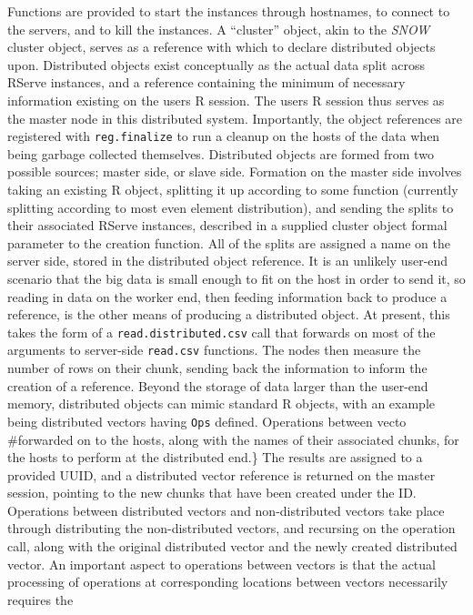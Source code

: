 Functions are provided to start the instances through hostnames, to
connect to the servers, and to kill the instances. A ``cluster'' object,
akin to the \emph{SNOW} cluster object, serves as a reference with which
to declare distributed objects upon. Distributed objects exist
conceptually as the actual data split across RServe instances, and a
reference containing the minimum of necessary information existing on
the users R session. The users R session thus serves as the master node
in this distributed system. Importantly, the object references are
registered with \texttt{reg.finalize} to run a cleanup on the hosts of
the data when being garbage collected themselves. Distributed objects
are formed from two possible sources; master side, or slave side.
Formation on the master side involves taking an existing R object,
splitting it up according to some function (currently splitting
according to most even element distribution), and sending the splits to
their associated RServe instances, described in a supplied cluster
object formal parameter to the creation function. All of the splits are
assigned a name on the server side, stored in the distributed object
reference. It is an unlikely user-end scenario that the big data is
small enough to fit on the host in order to send it, so reading in data
on the worker end, then feeding information back to produce a reference,
is the other means of producing a distributed object. At present, this
takes the form of a \texttt{read.distributed.csv} call that forwards on
most of the arguments to server-side \texttt{read.csv} functions. The
nodes then measure the number of rows on their chunk, sending back the
information to inform the creation of a reference. Beyond the storage of
data larger than the user-end memory, distributed objects can mimic
standard R objects, with an example being distributed vectors having
\texttt{Ops} defined. Operations between vecto \#forwarded on to the
hosts, along with the names of their associated chunks, for the hosts to
perform at the distributed end.\} The results are assigned to a provided
UUID, and a distributed vector reference is returned on the master
session, pointing to the new chunks that have been created under the ID.
Operations between distributed vectors and non-distributed vectors take
place through distributing the non-distributed vectors, and recursing on
the operation call, along with the original distributed vector and the
newly created distributed vector. An important aspect to operations
between vectors is that the actual processing of operations at
corresponding locations between vectors necessarily requires the
